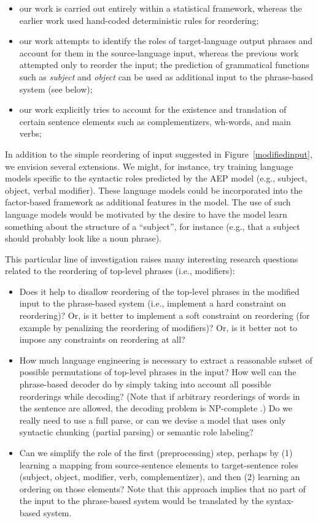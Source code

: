 \documentclass[11pt]{report}
\theoremstyle{plain}
\begin{document}
{\begin{itemize}
\item our work is carried out entirely within a statistical
framework, whereas the earlier work used hand-coded deterministic
rules for reordering;
\item our work attempts to identify the roles of target-language
output phrases and account for them in the source-language input,
whereas the previous work attempted only to reorder the input; the
prediction of grammatical functions such as {\em subject} and {\em
object} can be used as additional input to the phrase-based system
(see below);
\item our work explicitly tries to account for the existence and
translation of certain sentence elements such as complementizers,
wh-words, and main verbs;
\end{itemize}

In addition to the simple reordering of input suggested in
Figure~\ref{modifiedinput}, we envision several extensions. We might,
for instance, try training language models specific to the syntactic
roles predicted by the AEP model (e.g., subject, object, verbal
modifier). These language models could be incorporated into the
factor-based framework as additional features in the model. The use of
such language models would be motivated by the desire to have the
model learn something about the structure of a ``subject'', for
instance (e.g., that a subject should probably look like a noun
phrase).

This particular line of investigation raises many interesting research
questions related to the reordering of top-level phrases (i.e.,
modifiers):

\begin{itemize}
\item Does it help to disallow reordering of the top-level phrases in
the modified input to the phrase-based system (i.e., implement a hard
constraint on reordering)?  Or, is it better to implement a soft
constraint on reordering (for example by penalizing the reordering of
modifiers)?  Or, is it better not to impose any constraints on
reordering at all?
\item How much language engineering is necessary to extract a
reasonable subset of possible permutations of top-level phrases in the
input?  How well can the phrase-based decoder do by simply taking into
account all possible reorderings while decoding? (Note that if
arbitrary reorderings of words in the sentence are allowed, the
decoding problem is NP-complete .) Do we really need to
use a full parse, or can we devise a model that uses only syntactic
chunking (partial parsing) or semantic role labeling?
\item Can we simplify the role of the first (preprocessing) step,
perhaps by (1) learning a mapping from source-sentence elements to
target-sentence roles (subject, object, modifier, verb,
complementizer), and then (2) learning an ordering on those elements?
Note that this approach implies that no part of the input to the
phrase-based system would be translated by the syntax-based system.
\end{itemize}

}
\end{document}
